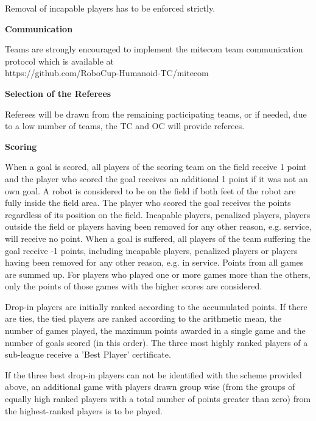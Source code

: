 Removal of incapable players has to be enforced strictly.

\bigskip
 
{\bfseries Communication}

Teams are strongly encouraged to implement the mitecom team communication protocol which is available at \\
\textcolor[rgb]{0.0,0.0,0.49803922}{https://github.com/RoboCup-Humanoid-TC/mitecom}

\bigskip
 
{\bfseries Selection of the Referees}

Referees will be drawn from the remaining participating teams, or if needed, due to a low number of teams, the TC and OC will provide referees. 

\bigskip
 
{\bfseries Scoring}

When a goal is scored, all players of the scoring team on the field receive 1 point and the player who scored the goal receives an additional 1 point if it was not an own goal. A robot is considered to be on the field if both feet of the robot are fully inside the field area. The player who scored the goal receives the points regardless of its position on the field. Incapable players, penalized players, players outside the field or players having been removed for any other reason, e.g. service, will receive no point. When a goal is suffered, all players of the team suffering the goal receive -1 points, including incapable players, penalized players or players having been removed for any other reason, e.g. in service. Points from all games are summed up. For players who played one or more games more than the others, only the points of those games with the higher scores are considered.

Drop-in players are initially ranked according to the accumulated points. If there are ties, the tied players are ranked according to the arithmetic mean, the number of games played, the maximum points awarded in a single game and the number of goals scored (in this order). The three most highly ranked players of a sub-league receive a 'Best Player' certificate.

If the three best drop-in players can not be identified with the scheme provided above, an additional game with players drawn group wise (from the groups of equally high ranked players with a total number of points greater than zero) from the highest-ranked players is to be played.

